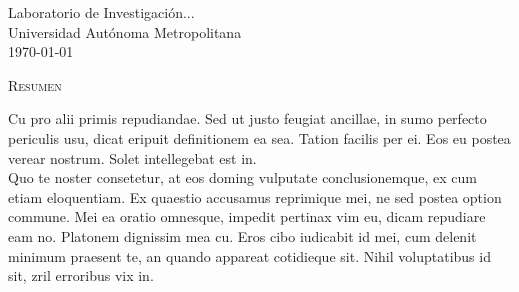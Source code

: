 \begin{titlepage}
\begin{center}
	\vfill
	\begin{flushright}
	Laboratorio de Investigación...\\
	Universidad Autónoma Metropolitana\\
		\normalsize\today
	\end{flushright}

\end{center}

\end{titlepage}

\blankpage
\pagebreak

\textsc{\Large Resumen}

Cu pro alii primis repudiandae. Sed ut justo feugiat ancillae, in sumo perfecto periculis usu, dicat eripuit definitionem ea sea. Tation facilis per ei. Eos eu postea verear nostrum. Solet intellegebat est in.\\[.2em]

Quo te noster consetetur, at eos doming vulputate conclusionemque, ex cum etiam eloquentiam. Ex quaestio accusamus reprimique mei, ne sed postea option commune. Mei ea oratio omnesque, impedit pertinax vim eu, dicam repudiare eam no. Platonem dignissim mea cu. Eros cibo iudicabit id mei, cum delenit minimum praesent te, an quando appareat cotidieque sit. Nihil voluptatibus id sit, zril erroribus vix in.


 
\tableofcontents